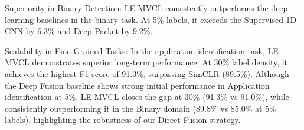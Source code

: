 \begin{table}[htbp]
\caption{Comprehensive Baseline Comparison (Macro F1-Score). \\ Models marked with ($^\dagger$) utilize unlabeled data for pre-training (Semi-Supervised), while others rely solely on the labeled subset (Supervised).}
\label{tab:baseline_comprehensive}
\centering
{}
\end{table}

Superiority in Binary Detection:
LE-MVCL consistently outperforms the deep learning baselines in the binary task. At 5\% labels, it exceeds the Supervised 1D-CNN by 6.3\% and Deep Packet by 9.2\%.

Scalability in Fine-Grained Tasks:
In the application identification task, LE-MVCL demonstrates superior long-term performance. At 30\% label density, it achieves the highest F1-score of 91.3\%, surpassing SimCLR (89.5\%). Although the Deep Fusion baseline shows strong initial performance in Application identification at 5\%, LE-MVCL closes the gap at 30\% (91.3\% vs 91.0\%), while consistently outperforming it in the Binary domain (89.8\% vs 85.0\% at 5\% labels), highlighting the robustness of our Direct Fusion strategy.

